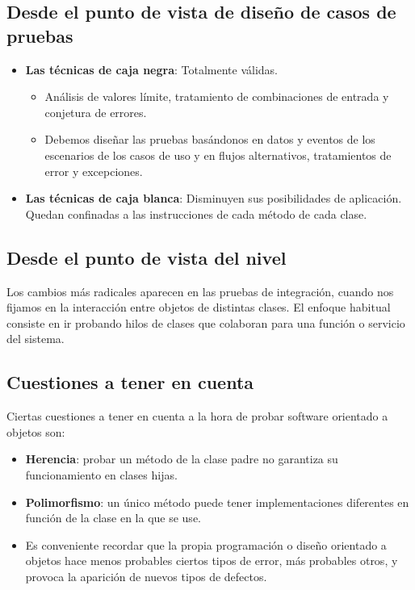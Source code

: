 \subsection{Desde el punto de vista de diseño de casos de pruebas}
\begin{itemize}
    \item \textbf{Las técnicas de caja negra}: Totalmente válidas.
    \begin{itemize}
        \item Análisis de valores límite, tratamiento de combinaciones de entrada y conjetura de errores.
        \item Debemos diseñar las pruebas basándonos en datos y eventos de los escenarios de los casos de uso y en flujos alternativos, tratamientos de error y excepciones.
    \end{itemize}
    \item \textbf{Las técnicas de caja blanca}: Disminuyen sus posibilidades de aplicación. Quedan confinadas a las instrucciones de cada método de cada clase.
\end{itemize}

\subsection{Desde el punto de vista del nivel}
Los cambios más radicales aparecen en las pruebas de integración, cuando nos fijamos en la interacción entre objetos de distintas clases. El enfoque habitual consiste en ir probando hilos de clases que colaboran para una función o servicio del sistema.

\subsection{Cuestiones a tener en cuenta}
Ciertas cuestiones a tener en cuenta a la hora de probar software orientado a objetos son:
\begin{itemize}
\item \textbf{Herencia}: probar un método de la clase padre no garantiza su funcionamiento en clases hijas.
\item \textbf{Polimorfismo}: un único método puede tener implementaciones diferentes en función de la clase en la que se use.
    \item Es conveniente recordar que la propia programación o diseño orientado a objetos hace menos probables ciertos tipos de error, más probables otros, y provoca la aparición de nuevos tipos de defectos. %
\end{itemize}

